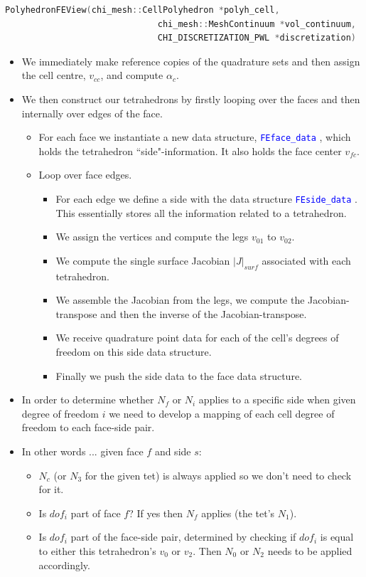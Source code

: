\documentclass[11pt,letterpaper,titlepage]{article}
\newcommand{\xmltag}[1]{\textcolor{blue}{ \texttt{#1}} }
\begin{document}
\begin{lstlisting}[language=c++]
PolyhedronFEView(chi_mesh::CellPolyhedron *polyh_cell,
                              chi_mesh::MeshContinuum *vol_continuum,
                              CHI_DISCRETIZATION_PWL *discretization)
\end{lstlisting}

\begin{itemize}
\item We immediately make reference copies of the quadrature sets and then assign the cell centre, $v_{cc}$, and compute $\alpha_c$.
\item We then construct our tetrahedrons by firstly looping over the faces and then internally over edges of the face.
\begin{itemize}
\item For each face we instantiate a new data structure, \xmltag{FEface\_data}, which holds the tetrahedron ``side"-information. It also holds the face center $v_{fc}$. 
\item Loop over face edges.
\begin{itemize}
\item For each edge we define a side with the data structure \xmltag{FEside\_data}. This essentially stores all the information related to a tetrahedron.
\item We assign the vertices and compute the legs $v_{01}$ to $v_{02}$.
\item We compute the single surface Jacobian $|J|_{surf}$ associated with each tetrahedron.
\item We assemble the Jacobian from the legs, we compute the Jacobian-transpose and then the inverse of the Jacobian-transpose.
\item We receive quadrature point data for each of the cell's degrees of freedom on this side data structure.
\item Finally we push the side data to the face data structure.
\end{itemize}
\end{itemize}


\item In order to determine whether $N_f$ or $N_i$ applies to a specific side when given degree of freedom $i$ we need to develop a mapping of each cell degree of freedom to each face-side pair.
\item In other words ... given face $f$ and side $s$:
\begin{itemize}
\item $N_c$ (or $N_3$ for the given tet) is always applied so we don't need to check for it.
\item Is $dof_i$ part of face $f$? If yes then $N_f$ applies (the tet's $N_1$). 
\item Is $dof_i$ part of the face-side pair, determined by checking if $dof_i$ is equal to either this tetrahedron's $v_0$ or $v_2$. Then $N_0$ or $N_2$ needs to be applied accordingly.
\end{itemize}


\end{itemize}
\end{document}
